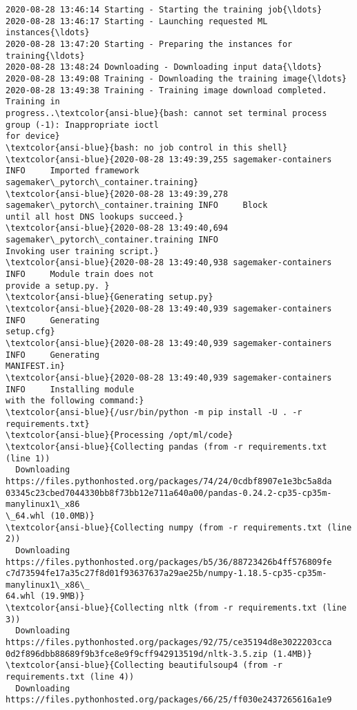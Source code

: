 \documentclass[11pt]{article}
\begin{document}
    \begin{Verbatim}[commandchars=\\\{\}]
2020-08-28 13:46:14 Starting - Starting the training job{\ldots}
2020-08-28 13:46:17 Starting - Launching requested ML instances{\ldots}
2020-08-28 13:47:20 Starting - Preparing the instances for training{\ldots}
2020-08-28 13:48:24 Downloading - Downloading input data{\ldots}
2020-08-28 13:49:08 Training - Downloading the training image{\ldots}
2020-08-28 13:49:38 Training - Training image download completed. Training in
progress..\textcolor{ansi-blue}{bash: cannot set terminal process group (-1): Inappropriate ioctl
for device}
\textcolor{ansi-blue}{bash: no job control in this shell}
\textcolor{ansi-blue}{2020-08-28 13:49:39,255 sagemaker-containers INFO     Imported framework
sagemaker\_pytorch\_container.training}
\textcolor{ansi-blue}{2020-08-28 13:49:39,278 sagemaker\_pytorch\_container.training INFO     Block
until all host DNS lookups succeed.}
\textcolor{ansi-blue}{2020-08-28 13:49:40,694 sagemaker\_pytorch\_container.training INFO
Invoking user training script.}
\textcolor{ansi-blue}{2020-08-28 13:49:40,938 sagemaker-containers INFO     Module train does not
provide a setup.py. }
\textcolor{ansi-blue}{Generating setup.py}
\textcolor{ansi-blue}{2020-08-28 13:49:40,939 sagemaker-containers INFO     Generating
setup.cfg}
\textcolor{ansi-blue}{2020-08-28 13:49:40,939 sagemaker-containers INFO     Generating
MANIFEST.in}
\textcolor{ansi-blue}{2020-08-28 13:49:40,939 sagemaker-containers INFO     Installing module
with the following command:}
\textcolor{ansi-blue}{/usr/bin/python -m pip install -U . -r requirements.txt}
\textcolor{ansi-blue}{Processing /opt/ml/code}
\textcolor{ansi-blue}{Collecting pandas (from -r requirements.txt (line 1))
  Downloading https://files.pythonhosted.org/packages/74/24/0cdbf8907e1e3bc5a8da
03345c23cbed7044330bb8f73bb12e711a640a00/pandas-0.24.2-cp35-cp35m-manylinux1\_x86
\_64.whl (10.0MB)}
\textcolor{ansi-blue}{Collecting numpy (from -r requirements.txt (line 2))
  Downloading https://files.pythonhosted.org/packages/b5/36/88723426b4ff576809fe
c7d73594fe17a35c27f8d01f93637637a29ae25b/numpy-1.18.5-cp35-cp35m-manylinux1\_x86\_
64.whl (19.9MB)}
\textcolor{ansi-blue}{Collecting nltk (from -r requirements.txt (line 3))
  Downloading https://files.pythonhosted.org/packages/92/75/ce35194d8e3022203cca
0d2f896dbb88689f9b3fce8e9f9cff942913519d/nltk-3.5.zip (1.4MB)}
\textcolor{ansi-blue}{Collecting beautifulsoup4 (from -r requirements.txt (line 4))
  Downloading https://files.pythonhosted.org/packages/66/25/ff030e2437265616a1e9

\end{Verbatim}
\end{document}
